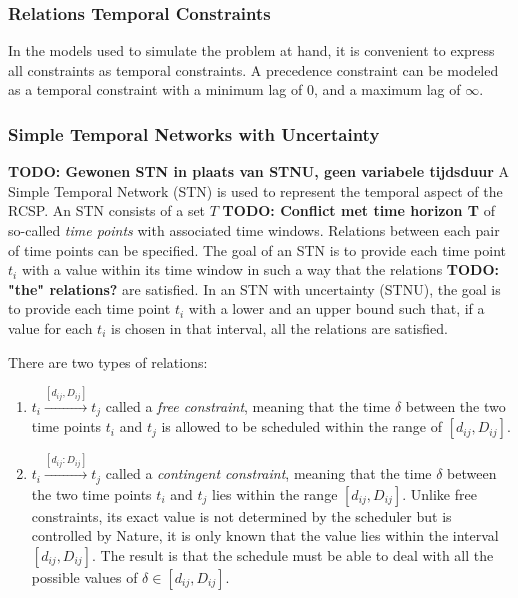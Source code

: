 \documentclass{article}
\newcommand{\TODO}[1]{{\color{red}\textbf{TODO: #1}}}
\begin{document}
\subsubsection{Relations Temporal Constraints}
In the models used to simulate the problem at hand, it is convenient to express all constraints as temporal constraints.
A precedence constraint can be modeled as a temporal constraint with a minimum lag of $0$, and a maximum lag of $\infty$.

\subsubsection{Simple Temporal Networks with Uncertainty}
\TODO{Gewonen STN in plaats van STNU, geen variabele tijdsduur}
A Simple Temporal Network (STN) is used to represent the temporal aspect of the RCSP.
An STN consists of a set $T$ \TODO{Conflict met time horizon T} of so-called \emph{time points} with associated time windows.
Relations between each pair of time points can be specified.
The goal of an STN is to provide each time point $t_i$ with a value within its time window in such a way that the relations \TODO{"the" relations?} are satisfied.
In an STN with uncertainty (STNU), the goal is to provide each time point $t_i$ with a lower and an upper bound such that, if a value for each $t_i$ is chosen in that interval, all the relations are satisfied.

There are two types of relations:
\begin{enumerate}
\item $t_i \xrightarrow{[d_{ij},D_{ij}]} t_j$ called a \emph{free constraint}, meaning that the time $\delta$ between the two time points $t_i$ and $t_j$ is allowed to be scheduled within the range of $[d_{ij},D_{ij}]$.
\item $t_i \xrightarrow{[d_{ij}:D_{ij}]} t_j$ called a \emph{contingent constraint}, meaning that the time $\delta$ between the two time points $t_i$ and $t_j$ lies within the range $[d_{ij},D_{ij}]$.
Unlike free constraints, its exact value is not determined by the scheduler but is controlled by Nature, it is only known that the value lies within the interval $[d_{ij},D_{ij}]$.
The result is that the schedule must be able to deal with all the possible values of $\delta \in [d_{ij},D_{ij}]$.
\end{enumerate}
\end{document}
